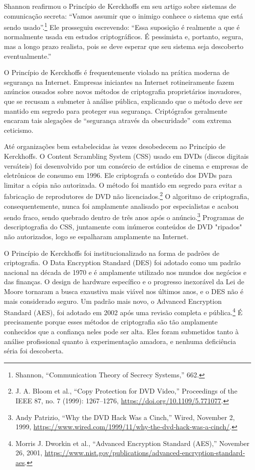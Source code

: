 \documentclass{book}
\begin{document}
Shannon reafirmou o Princípio de Kerckhoffs em seu artigo sobre sistemas de comunicação secreta: ``Vamos assumir que o inimigo conhece o sistema que está sendo usado''.\footnote{Shannon, “Communication Theory of Secrecy Systems,” 662.} Ele prosseguiu escrevendo:
``Essa suposição é realmente a que é normalmente usada em estudos criptográficos. É pessimista e, portanto, segura, mas a longo prazo realista, pois se deve esperar que seu sistema seja descoberto eventualmente.''

O Princípio de Kerckhoffs é frequentemente violado na prática moderna de segurança na Internet. Empresas iniciantes na Internet rotineiramente fazem anúncios ousados sobre novos métodos de criptografia proprietários inovadores, que se recusam a submeter à análise pública, explicando que o método deve ser mantido em segredo para proteger sua segurança. Criptógrafos geralmente encaram tais alegações de ``segurança através da obscuridade'' com extrema ceticismo.

Até organizações bem estabelecidas às vezes desobedecem ao Princípio de Kerckhoffs. O Content Scrambling System (CSS) usado em DVDs (discos digitais versáteis) foi desenvolvido por um consórcio de estúdios de cinema e empresas de eletrônicos de consumo em 1996. Ele criptografa o conteúdo dos DVDs para limitar a cópia não autorizada. O método foi mantido em segredo para evitar a fabricação de reprodutores de DVD não licenciados.\footnote{J. A. Bloom et al., “Copy Protection for DVD Video,” Proceedings of the IEEE 87, no. 7 (1999): 1267–1276, \url{https://doi.org/10.1109/5.771077}.} O algoritmo de criptografia, consequentemente, nunca foi amplamente analisado por especialistas e acabou sendo fraco, sendo quebrado dentro de três anos após o anúncio.\footnote{Andy Patrizio, “Why the DVD Hack Was a Cinch,” Wired, November 2, 1999, \url{https://www.wired.com/1999/11/why‐the‐dvd‐hack‐was‐a‐cinch/}.} Programas de descriptografia do CSS, juntamente com inúmeros conteúdos de DVD "ripados" não autorizados, logo se espalharam amplamente na Internet.

O Princípio de Kerckhoffs foi institucionalizado na forma de padrões de criptografia. O Data Encryption Standard (DES) foi adotado como um padrão nacional na década de 1970 e é amplamente utilizado nos mundos dos negócios e das finanças. O design de hardware específico e o progresso inexorável da Lei de Moore tornaram a busca exaustiva mais viável nos últimos anos, e o DES não é mais considerado seguro. Um padrão mais novo, o Advanced Encryption Standard (AES), foi adotado em 2002 após uma revisão completa e pública.\footnote{Morris J. Dworkin et al., “Advanced Encryption Standard (AES),” November 26, 2001, \url{https://www.nist.gov/publications/advanced‐encryption‐standard‐aes}.} É precisamente porque esses métodos de criptografia são tão amplamente conhecidos que a confiança neles pode ser alta. Eles foram submetidos tanto à análise profissional quanto à experimentação amadora, e nenhuma deficiência séria foi descoberta.
\end{document}
